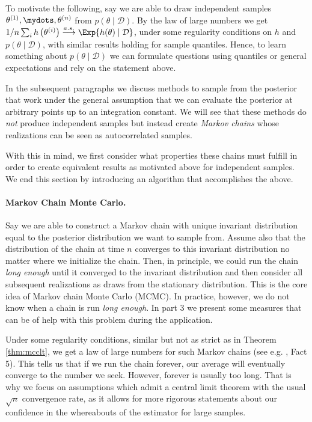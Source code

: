 To motivate the following, say we are able to draw independent samples $\theta^{(1)}, \mydots, \theta^{(n)}$ from $p(\theta \mid \mathcal{D})$.
By the law of large numbers we get $1 / n \sum_i h\left(\theta^{(i)}\right) \overset{a.s.}{\longrightarrow} \Exp{h(\theta) \mid \mathcal{D}}$, under some regularity conditions on $h$ and $p(\theta \mid \mathcal{D})$, with similar results holding for sample quantiles.
Hence, to learn something about $p(\theta \mid \mathcal{D})$ we can formulate questions using quantiles or general expectations and rely on the statement above.

In the subsequent paragraphs we discuss methods to sample from the posterior that work under the general assumption that we can evaluate the posterior at arbitrary points up to an integration constant.
We will see that these methods do \emph{not} produce independent samples but instead create \emph{Markov chains} whose realizations can be seen as autocorrelated samples.

With this in mind, we first consider what properties these chains must fulfill in order to create equivalent results as motivated above for independent samples.
We end this section by introducing an algorithm that accomplishes the above.

\paragraph{Markov Chain Monte Carlo.}
Say we are able to construct a Markov chain with unique invariant distribution equal to the posterior distribution we want to sample from.
Assume also that the distribution of the chain at time $n$ converges to this invariant distribution no matter where we initialize the chain.
Then, in principle, we could run the chain \emph{long enough} until it converged to the invariant distribution and then consider all subsequent realizations as draws from the stationary distribution.
This is the core idea of Markov chain Monte Carlo (MCMC).
In practice, however, we do not know when a chain is run \emph{long enough}.
In part 3 we present some measures that can be of help with this problem during the application.

Under some regularity conditions, similar but not as strict as in Theorem \ref{thm:mcclt}, we get a law of large numbers for such Markov chains (see e.g. \citet{roberts2004}, Fact 5).
This tells us that if we run the chain forever, our average will eventually converge to the number we seek.
However, forever is usually too long.
That is why we focus on assumptions which admit a central limit theorem with the usual $\sqrt{n}$ convergence rate, as it allows for more rigorous statements about our confidence in the whereabouts of the estimator for large samples.

